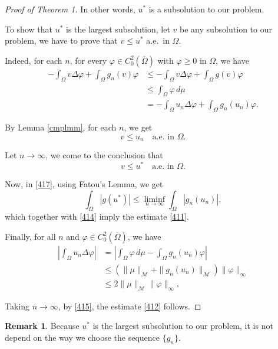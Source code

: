 \documentclass[a4paper, 11pt]{report}
\theoremstyle{definition}\newtheorem*{rmk}{Remark}
\begin{document}
\begin{proof}[Proof of Theorem 1]
In other words, $u^*$ is a subsolution to our problem.

To show that $u^*$ is the largest subsolution, let $v$ be any subsolution to our problem, we have to prove that $v \le u^*$ a.e.\ in $\Omega$.

Indeed, for each $n$, for every $\varphi \in C_0^2(\overline{\Omega})$ with $\varphi \ge 0$ in $\Omega$, we have
\begin{align*}
-\int_{\Omega}v \Delta \varphi + \int_{\Omega} g_n(v)\varphi &\le -\int_{\Omega}v \Delta \varphi + \int_{\Omega}g(v)\varphi \\
&\le \int_{\Omega} \varphi \, d\mu \\
& = -\int_{\Omega}u_n \Delta \varphi + \int_{\Omega} g_n(u_n)\varphi.
\end{align*}

By Lemma \ref{cmplmm}, for each $n$, we get
\[
v \le u_n \quad \text{a.e.\ in }\Omega.
\]

Let $n \to \infty$, we come to the conclusion that
\[
v \le u^* \quad \text{a.e.\ in } \Omega.
\]

Now, in \eqref{417}, using Fatou's Lemma, we get
\[
\int_{\Omega}|g(u^*)| \le \liminf_{n\to \infty} \int_{\Omega}|g_n(u_n)|,
\]
which together with \eqref{414} imply the estimate \eqref{411}.

Finally, for all $n$ and $\varphi \in C^2_0(\overline{\Omega})$, we have
\begin{align*}
\left|\int_{\Omega}u_n \Delta \varphi\right| &=  \left|\int_{\Omega} \varphi \,d\mu - \int_{\Omega}g_n(u_n)\varphi \right|\\
&\le (\| \mu \|_{\mathcal{M}} + \| g_n(u_n) \|_{\mathcal{M}})\| \varphi \|_{\infty}\\
&\le 2\| \mu\|_{\mathcal{M}} \| \varphi \|_{\infty},
\end{align*}

Taking $n \to \infty$, by \eqref{415}, the estimate \eqref{412} follows.
\end{proof}

\begin{rmk}
Because $u^*$ is the largest subsolution to our problem, it is not depend on the way we choose the sequence $\{g_n\}$.
\end{rmk}
\end{document}
